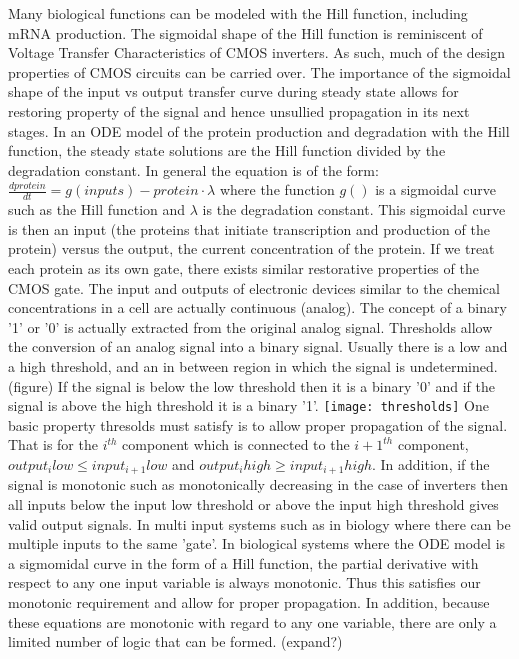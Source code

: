 \documentclass{article}
\begin{document}
Many biological functions can be modeled with the Hill function, including mRNA production.  The sigmoidal shape of the Hill function is reminiscent of Voltage Transfer Characteristics of CMOS inverters.  As such, much of the design properties of CMOS circuits can be carried over.  The importance of the sigmoidal shape of the input vs output transfer curve during steady state allows for restoring property of the signal and hence unsullied propagation in its next stages.   In an ODE model of the protein production and degradation with the Hill function, the steady state solutions are the Hill function divided by the degradation constant.  In general the equation is of the form: $\frac{dprotein}{dt}=g(inputs)-protein\cdot\lambda$  where the function $g()$ is a sigmoidal curve such as the Hill function and $\lambda$ is the degradation constant.  This sigmoidal curve is then an input (the proteins that initiate transcription and production of the protein) versus the output, the current concentration of the protein.  If we treat each protein as its own gate, there exists similar restorative properties of the CMOS gate.
\newline \newline
The input and outputs of electronic devices similar to the chemical concentrations in a cell are actually continuous (analog).  The concept of a binary '1' or '0' is actually extracted from the original analog signal.  Thresholds allow the conversion of an analog signal into a binary signal.  Usually there is a low and a high threshold, and an in between region in which the signal is undetermined.(figure)  If the signal is below the low threshold then it is a binary '0' and if the signal is above the high threshold it is a binary '1'.  
\newline
\texttt{[image: thresholds]}
\newline
One basic property thresolds must satisfy is to allow proper propagation of the signal.  That is for the $i^{th}$ component which is connected to the $i+1^{th}$ component, $output_i low \leq input_{i+1} low$ and $output_i high \geq input_{i+1} high$.  In addition, if the signal is monotonic such as monotonically decreasing in the case of inverters then all inputs below the input low threshold or above the input high threshold gives valid output signals.  In multi input systems such as in biology where there can be multiple inputs to the same 'gate'.  In biological systems where the ODE model is a sigmomidal curve in the form of a Hill function, the partial derivative with respect to any one input variable is always monotonic.  Thus this satisfies our monotonic requirement and allow for proper propagation.  In addition, because these equations are monotonic with regard to any one variable, there are only a limited number of logic that can be formed.  (expand?)
\end{document}
